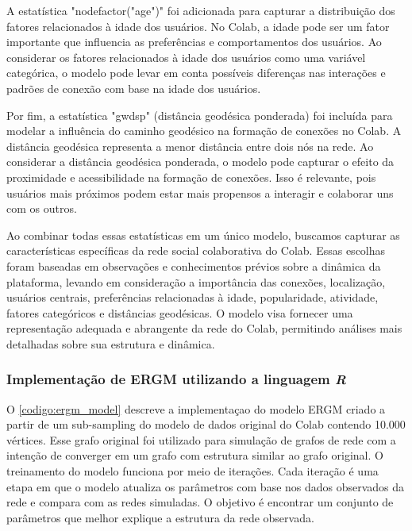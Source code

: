 A estatística "nodefactor("age")" foi adicionada para capturar a distribuição dos fatores relacionados à idade dos usuários. No Colab, a idade pode ser um fator importante que influencia as preferências e comportamentos dos usuários. Ao considerar os fatores relacionados à idade dos usuários como uma variável categórica, o modelo pode levar em conta possíveis diferenças nas interações e padrões de conexão com base na idade dos usuários.

Por fim, a estatística "gwdsp" (distância geodésica ponderada) foi incluída para modelar a influência do caminho geodésico na formação de conexões no Colab. A distância geodésica representa a menor distância entre dois nós na rede. Ao considerar a distância geodésica ponderada, o modelo pode capturar o efeito da proximidade e acessibilidade na formação de conexões. Isso é relevante, pois usuários mais próximos podem estar mais propensos a interagir e colaborar uns com os outros.

Ao combinar todas essas estatísticas em um único modelo, buscamos capturar as características específicas da rede social colaborativa do Colab. Essas escolhas foram baseadas em observações e conhecimentos prévios sobre a dinâmica da plataforma, levando em consideração a importância das conexões, localização, usuários centrais, preferências relacionadas à idade, popularidade, atividade, fatores categóricos e distâncias geodésicas. O modelo visa fornecer uma representação adequada e abrangente da rede do Colab, permitindo análises mais detalhadas sobre sua estrutura e dinâmica.

\subsubsection*{Implementação de ERGM utilizando a linguagem \textit{R}}

O \autoref{codigo:ergm_model} descreve a implementaçao do modelo ERGM criado a partir de um sub-sampling do modelo de dados original do Colab contendo 10.000 vértices. Esse grafo original foi utilizado para simulação de grafos de rede com a intenção de converger em um grafo com estrutura similar ao grafo original. O treinamento do modelo funciona por meio de iterações. Cada iteração é uma etapa em que o modelo atualiza os parâmetros com base nos dados observados da rede e compara com as redes simuladas. O objetivo é encontrar um conjunto de parâmetros que melhor explique a estrutura da rede observada.

